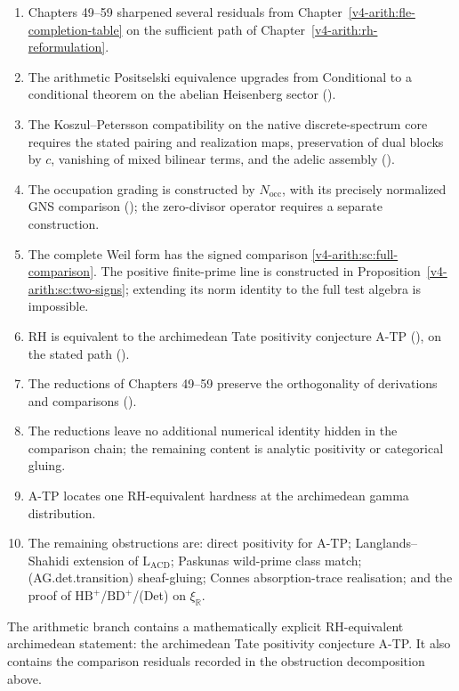 \begin{enumerate}
\item Chapters 49--59 sharpened several residuals from
Chapter~\ref{v4-arith:fle-completion-table} on the sufficient path
of Chapter~\ref{v4-arith:rh-reformulation}.
\item The arithmetic Positselski equivalence upgrades from
Conditional to a conditional theorem on the abelian Heisenberg sector
().
\item The Koszul--Petersson compatibility on the native
discrete-spectrum core requires the stated pairing and realization maps,
preservation of dual blocks by $c$, vanishing of mixed bilinear terms,
and the adelic assembly
().
\item The occupation grading is constructed by \(N_{\mathrm{occ}}\),
with its precisely normalized GNS comparison
(); the zero-divisor
operator requires a separate construction.
\item The complete Weil form has the signed comparison
\eqref{v4-arith:sc:full-comparison}. The positive finite-prime line
is constructed in Proposition~\ref{v4-arith:sc:two-signs}; extending its norm
identity to the full test algebra is impossible.
\item RH is equivalent to the archimedean Tate positivity conjecture
A-TP (),
on the stated path
().
\item The reductions of Chapters 49--59 preserve the orthogonality of
derivations and comparisons
().
\item The reductions leave no additional numerical identity hidden in
the comparison chain; the remaining content is analytic positivity or
categorical gluing.
\item A-TP locates one RH-equivalent hardness at the archimedean gamma
distribution.
\item The remaining obstructions are: direct positivity for A-TP;
Langlands--Shahidi extension of \(\mathrm{L}_{\mathrm{ACD}}\);
Paskunas wild-prime class match; (AG.det.transition) sheaf-gluing;
Connes absorption-trace realisation; and the proof of
\(\mathrm{HB}^{+}\)/\(\mathrm{BD}^{+}\)/(Det) on \(\xi_{\mathbb{R}}\).
\end{enumerate}

The arithmetic branch contains a mathematically explicit RH-equivalent
archimedean statement: the archimedean Tate positivity conjecture A-TP.
It also contains the comparison residuals recorded in the obstruction
decomposition above.

